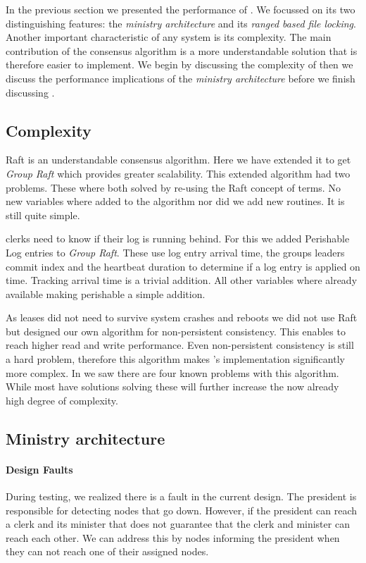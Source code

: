 In the previous section we presented the performance of \name{}. We focussed on its two distinguishing features: the \textit{ministry architecture} and its \textit{ranged based file locking}. Another important characteristic of any system is its complexity. The main contribution of the \raft{} consensus algorithm is a more understandable solution that is therefore easier to implement. We begin by discussing the complexity of \name{} then we discuss the performance implications of the \textit{ministry architecture} before we finish discussing .
%
\subsection{Complexity}
Raft is an understandable consensus algorithm. Here we have extended it to get \textit{Group Raft} which provides greater scalability. This extended algorithm had two problems. These where both solved by re-using the Raft concept of terms. No new variables where added to the algorithm nor did we add new routines. It is still quite simple. 

\Name{} clerks need to know if their log is running behind. For this we added Perishable Log entries to \textit{Group Raft}. These use log entry arrival time, the groups leaders commit index and the heartbeat duration to determine if a log entry is applied on time. Tracking arrival time is a trivial addition. All other variables where already available making perishable a simple addition.

As leases did not need to survive system crashes and reboots we did not use Raft but designed our own algorithm for non-persistent consistency. This enables \name{} to reach higher read and write performance. Even non-persistent consistency is still a hard problem, therefore this algorithm makes \name{}'s implementation significantly more complex. In  we saw there are four known problems with this algorithm. While most have solutions solving these will further increase the now already high degree of complexity.
%
\subsection{Ministry architecture}
\paragraph{Design Faults}
During testing, we realized there is a fault in the current design. The president is responsible for detecting nodes that go down. However, if the president can reach a clerk and its minister that does not guarantee that the clerk and minister can reach each other. We can address this by nodes informing the president when they can not reach one of their assigned nodes.

